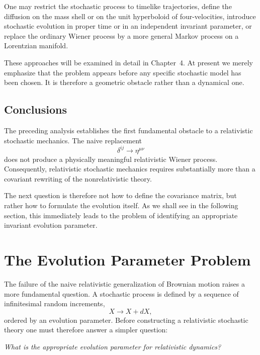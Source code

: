 One may restrict the stochastic process to timelike trajectories, define
the diffusion on the mass shell or on the unit hyperboloid of
four-velocities, introduce stochastic evolution in proper time or in an
independent invariant parameter, or replace the ordinary Wiener process
by a more general Markov process on a Lorentzian manifold.

These approaches will be examined in detail in Chapter~4.
At present we merely emphasize that the problem appears before any
specific stochastic model has been chosen. It is therefore a geometric
obstacle rather than a dynamical one.

\subsection{Conclusions}

The preceding analysis establishes the first fundamental obstacle to a
relativistic stochastic mechanics.
The naive replacement
\[\delta^{ij}\longrightarrow\eta^{\mu\nu}\]
does not produce a physically meaningful relativistic Wiener process.
Consequently, relativistic stochastic mechanics requires substantially
more than a covariant rewriting of the nonrelativistic theory.

The next question is therefore not how to define the covariance matrix,
but rather how to formulate the evolution itself.
As we shall see in the following section, this immediately leads to the
problem of identifying an appropriate invariant evolution parameter.
\section{The Evolution Parameter Problem}

The failure of the naive relativistic generalization of Brownian motion
raises a more fundamental question. A stochastic process is defined by a
sequence of infinitesimal random increments,
\[X \longrightarrow X+dX,\]
ordered by an evolution parameter. Before constructing a relativistic
stochastic theory one must therefore answer a simpler question:
\begin{center}
\emph{What is the appropriate evolution parameter for relativistic
dynamics?}
\end{center}

